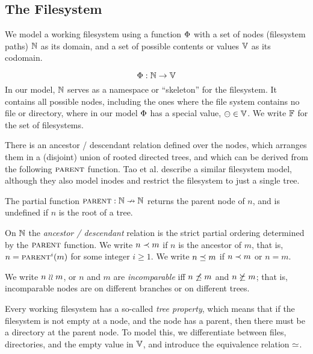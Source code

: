 
\subsection{The Filesystem}

We model a working filesystem
using a function $\Phi$ with a set of nodes (filesystem paths) $\mathbb{N}$ as its domain,
and a set of possible contents or values $\mathbb{V}$ as its codomain.
\begin{mydef}
\[ \Phi: \mathbb{N} \rightarrow \mathbb{V} \]
In our model, $\mathbb{N}$ 
serves as a namespace or ``skeleton'' for the filesystem.
It contains all possible nodes, including the ones 
where the file system contains no file or directory,
where in our model $\Phi$ has a special value, $\ominus\in\mathbb{V}$.
We write $\mathbb{F}$ for the set of filesystems.
\end{mydef}

There is an ancestor / descendant relation defined over the nodes,
which arranges them in a (disjoint) union of rooted directed trees,
and which can be derived from the following $\parent$ function.
Tao et al. \cite{TSR} describe a similar filesystem model, although
they also model inodes and restrict the filesystem to just a single tree.
\begin{mydef}[$\parent$]
The partial function $\text{\normalfont\scshape{parent}}:\mathbb{N}\nrightarrow\mathbb{N}$
returns the parent node of $n$,
and is undefined if $n$ is the root of a tree.
\end{mydef}

\begin{mydef}[$n\descendant m$]
On $\mathbb{N}$ the \emph{ancestor / descendant} relation is the
strict partial ordering determined by the $\parent$ function.
We write $n\descendant m$ if $n$ is the ancestor of $m$,
that is, $n=\text{\normalfont\scshape{parent}}^i(m)$ for some integer $i\ge 1$.
We write $n\preceq m$ if $n\descendant m$ or $n=m$.
\end{mydef}

\begin{mydef}[$n\unrel m$]
We write $n\unrel m$, or $n$ and $m$ are \emph{incomparable}
iff $n\not\preceq m$ and $n\not\succeq m$;
that is, incomparable nodes are on different branches or on different trees.
\end{mydef}

Every working filesystem has a so-called \emph{tree property}, which means that
if the filesystem is not empty at a node, and the node has a parent,
then there must be a directory at the parent node.
To model this, we differentiate between files, directories, and the
empty value in $\mathbb{V}$, and introduce the equivalence relation
$\simeq$.


